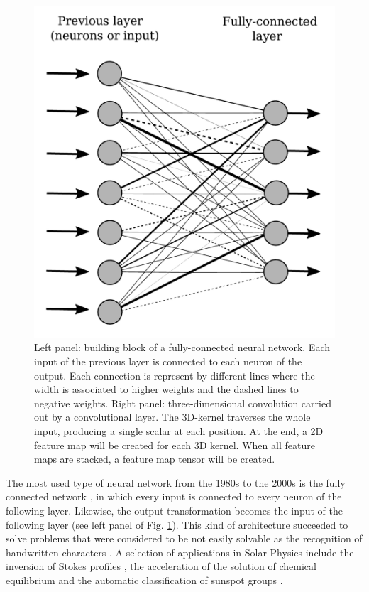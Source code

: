 \begin{figure}
\centering
\includegraphics[width=\textwidth]{figs/fullc.pdf}
\caption{Left panel: building block of a fully-connected neural network. Each input of the previous 
layer is connected to each neuron of the output. Each connection is represent by different 
lines where the width is associated to higher weights and the dashed lines to negative weights. 
Right panel: three-dimensional convolution carried out by a convolutional layer. The 3D-kernel traverses
the whole input, producing a single scalar at each position. At the end, a 2D feature map will be 
created for each 3D kernel. When all feature maps are stacked, a feature map tensor will be created.}
\label{fig:networks}
\end{figure}

The most used type of neural network from the 1980s to the 2000s
is the fully connected network \cite[FCN; see][for an overview]{Overview2014}, 
in which every input is connected to every neuron of the following layer. Likewise, the output 
transformation becomes the input of the following layer (see left panel of Fig. \ref{fig:networks}).
This kind of architecture succeeded to solve problems that were considered to be not easily solvable as the recognition of handwritten characters \cite{B96}. A selection of applications in Solar Physics include the inversion of Stokes profiles 
\cite[e.g.,][]{socas05,carroll08}, the acceleration of the solution of chemical equilibrium \cite{asensio05}
and the automatic classification of sunspot groups \cite{colak08}.


